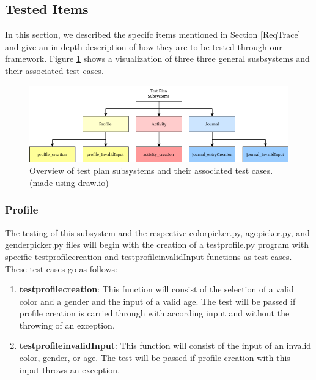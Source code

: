 \documentclass{article}
\begin{document}
\subsection{Tested Items}
In this section, we described the specifc items mentioned in Section \ref{ReqTrace} and give an in-depth description of how they are to be tested through our framework. Figure \ref{Figure2} shows a visualization of three three general susbsystems and their associated test cases.
\begin{figure}
\includegraphics[scale=0.5]{../imgs/Figure2.png}
\caption{Overview of test plan subsystems and their associated test cases. (made using draw.io)}
\label{Figure2}
\end{figure}
\subsubsection{Profile}
The testing of this subsystem and the respective colorpicker.py, agepicker.py, and genderpicker.py files will begin with the creation of a test\textunderscore profile.py program with specific test\textunderscore profile\textunderscore creation and test\textunderscore profile\textunderscore invalidInput functions as test cases. These test cases go as follows:
\begin{enumerate}
\itemsep-0.5em
\item \textbf{test\textunderscore profile\textunderscore creation}: This function will consist of the selection of a valid color and a gender and the input of a valid age. The test will be passed if profile creation is carried through with according input and without the throwing of an exception.
\item \textbf{test\textunderscore profile\textunderscore invalidInput}: This function will consist of the input of an invalid color, gender, or age. The test will be passed if profile creation with this input throws an exception.
\end{enumerate}
\end{document}
